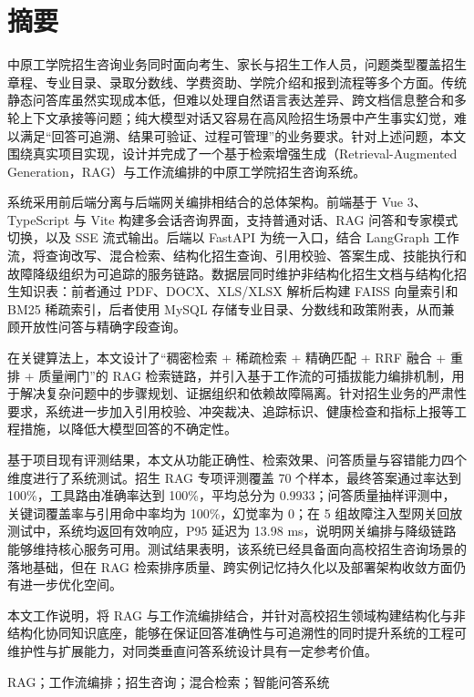 \documentclass[UTF8,zihao=-4,oneside,fontset=windows]{ctexbook}
\numberwithin{equation}{chapter}
\begin{document}
\clearpage
{}
\setcounter{page}{1}
\pagestyle{thesisfront}

\chapter*{摘\quad 要}
中原工学院招生咨询业务同时面向考生、家长与招生工作人员，问题类型覆盖招生章程、专业目录、录取分数线、学费资助、学院介绍和报到流程等多个方面。传统静态问答库虽然实现成本低，但难以处理自然语言表达差异、跨文档信息整合和多轮上下文承接等问题；纯大模型对话又容易在高风险招生场景中产生事实幻觉，难以满足“回答可追溯、结果可验证、过程可管理”的业务要求。针对上述问题，本文围绕真实项目实现，设计并完成了一个基于检索增强生成（Retrieval-Augmented Generation，RAG）与工作流编排的中原工学院招生咨询系统。

系统采用前后端分离与后端网关编排相结合的总体架构。前端基于 Vue 3、TypeScript 与 Vite 构建多会话咨询界面，支持普通对话、RAG 问答和专家模式切换，以及 SSE 流式输出。后端以 FastAPI 为统一入口，结合 LangGraph 工作流，将查询改写、混合检索、结构化招生查询、引用校验、答案生成、技能执行和故障降级组织为可追踪的服务链路。数据层同时维护非结构化招生文档与结构化招生知识表：前者通过 PDF、DOCX、XLS/XLSX 解析后构建 FAISS 向量索引和 BM25 稀疏索引，后者使用 MySQL 存储专业目录、分数线和政策附表，从而兼顾开放性问答与精确字段查询。

在关键算法上，本文设计了“稠密检索 + 稀疏检索 + 精确匹配 + RRF 融合 + 重排 + 质量闸门”的 RAG 检索链路，并引入基于工作流的可插拔能力编排机制，用于解决复杂问题中的步骤规划、证据组织和依赖故障隔离。针对招生业务的严肃性要求，系统进一步加入引用校验、冲突裁决、追踪标识、健康检查和指标上报等工程措施，以降低大模型回答的不确定性。

基于项目现有评测结果，本文从功能正确性、检索效果、问答质量与容错能力四个维度进行了系统测试。招生 RAG 专项评测覆盖 70 个样本，最终答案通过率达到 100\%，工具路由准确率达到 100\%，平均总分为 0.9933；问答质量抽样评测中，关键词覆盖率与引用命中率均为 100\%，幻觉率为 0；在 5 组故障注入型网关回放测试中，系统均返回有效响应，P95 延迟为 13.98 ms，说明网关编排与降级链路能够维持核心服务可用。测试结果表明，该系统已经具备面向高校招生咨询场景的落地基础，但在 RAG 检索排序质量、跨实例记忆持久化以及部署架构收敛方面仍有进一步优化空间。

本文工作说明，将 RAG 与工作流编排结合，并针对高校招生领域构建结构化与非结构化协同知识底座，能够在保证回答准确性与可追溯性的同时提升系统的工程可维护性与扩展能力，对同类垂直问答系统设计具有一定参考价值。

\vspace{0.8em}
RAG；工作流编排；招生咨询；混合检索；智能问答系统
\end{document}
